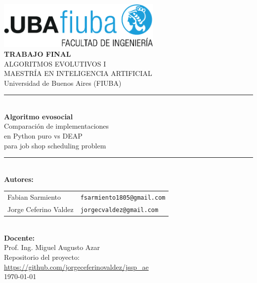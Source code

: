 \documentclass[12pt,a4paper]{article}
\begin{document}
\begin{titlepage}
    \centering

    \includegraphics[width=0.6\textwidth]{Figuras/uba.png}\\[1cm]
    
    {\LARGE\bfseries TRABAJO FINAL\\[0.5cm]}
    {\Large ALGORITMOS EVOLUTIVOS I\\[0.3cm]}
    {\large MAESTRÍA EN INTELIGENCIA ARTIFICIAL\\[0.2cm]}
    {\large Universidad de Buenos Aires (FIUBA)\\[1cm]}
    
    \rule{\textwidth}{1.5pt}\\[0.4cm]
    {\Huge\bfseries Algoritmo evosocial\\[0.2cm]}
    {\LARGE Comparación de implementaciones\\[0.1cm] en Python puro vs DEAP\\[0.1cm] para job shop scheduling problem\\[0.2cm]}
    \rule{\textwidth}{1pt}\\[1cm]
    
    {\large\bfseries Autores:\\[0.3cm]}
    \begin{tabular}{ll}
        Fabian Sarmiento & \texttt{fsarmiento1805@gmail.com} \\
        Jorge Ceferino Valdez & \texttt{jorgecvaldez@gmail.com}
    \end{tabular}\\[1cm]
    
    {\large\bfseries Docente:\\[0.3cm]}
    Prof. Ing. Miguel Augusto Azar\\[1cm]
    
    {\large Repositorio del proyecto:\\[0.2cm]}
    \url{https://github.com/jorgeceferinovaldez/jssp_ae}\\[0.5cm]
    
    {\small \today}

\end{titlepage}

\tableofcontents
\newpage
\end{document}
